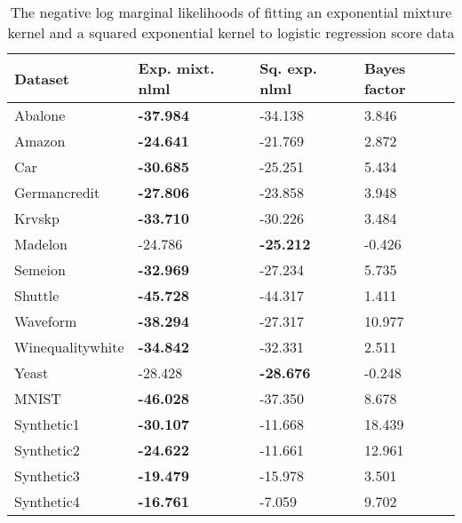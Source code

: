 \documentclass[a4paper,12pt,twoside,openright]{report}
\begin{document}
\begin{table}[t]
\centering
	\begin{tabular}{|l|l|l|l|}
\hline
Dataset          & Exp. mixt. nlml & Sq. exp. nlml & Bayes factor \\ \hline\hline
Abalone          & \textbf{-37.984}  & -34.138  & 3.846         \\ \hline
Amazon           & \textbf{-24.641}  & -21.769  & 2.872         \\ \hline
Car              & \textbf{-30.685}  & -25.251  & 5.434         \\ \hline
Germancredit     & \textbf{-27.806}  & -23.858  & 3.948         \\ \hline
Krvskp           & \textbf{-33.710}  & -30.226  & 3.484         \\ \hline
Madelon          & -24.786           & \textbf{-25.212} & -0.426  \\ \hline
Semeion          & \textbf{-32.969}  & -27.234  & 5.735         \\ \hline
Shuttle          & \textbf{-45.728}  & -44.317  & 1.411         \\ \hline
Waveform         & \textbf{-38.294}  & -27.317  & 10.977        \\ \hline
Winequalitywhite & \textbf{-34.842}  & -32.331  & 2.511         \\ \hline
Yeast            & -28.428           & \textbf{-28.676} & -0.248  \\ \hline\hline
MNIST            & \textbf{-46.028}  & -37.350  & 8.678         \\ \hline
Synthetic1       & \textbf{-30.107}  & -11.668  & 18.439        \\ \hline
Synthetic2       & \textbf{-24.622}  & -11.661  & 12.961        \\ \hline
Synthetic3       & \textbf{-19.479}  & -15.978  & 3.501        \\ \hline
Synthetic4       & \textbf{-16.761}  & -7.059   & 9.702         \\ \hline
\end{tabular}

	\caption{The negative log marginal likelihoods of fitting an exponential mixture kernel and a squared exponential kernel to logistic regression score data}
\label{log_reg_fits}
\end{table}
\end{document}
